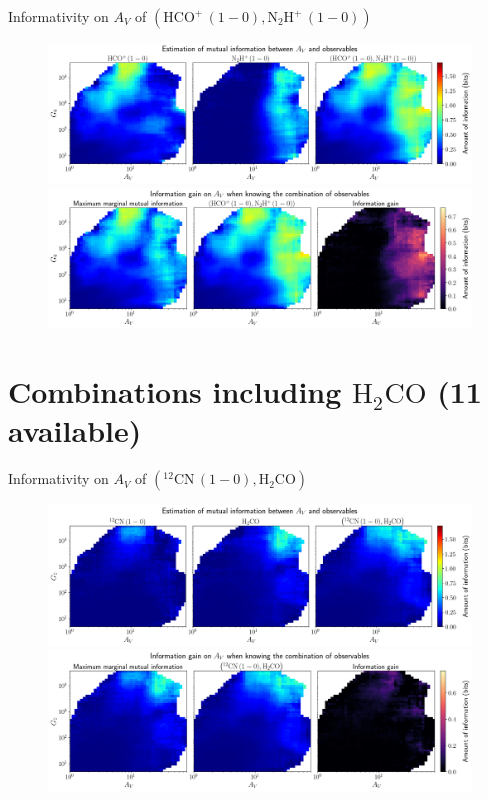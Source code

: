\documentclass{beamer}
\begin{document}
\begin{frame}{Informativity on $A_V$ of $\left(\mathrm{HCO^+\,(1-0)},\mathrm{N_2H^+\,(1-0)}\right)$}
    \begin{figure}
        \centering
        \includegraphics[width=0.95\linewidth]{../mi/av__hcop10_n2hp10_mi.png}
        \vfill
        \includegraphics[width=0.95\linewidth]{../mi/av__hcop10_n2hp10_mi_gain.png}
    \end{figure}
\end{frame}

\section{Combinations including $\mathrm{H_2CO}$ (11 available)}

\begin{frame}{Informativity on $A_V$ of $\left(\mathrm{^{12}CN\,(1-0)},\mathrm{H_2CO}\right)$}
    \begin{figure}
        \centering
        \includegraphics[width=0.95\linewidth]{../mi/av__12cn10_h2co_mi.png}
        \vfill
        \includegraphics[width=0.95\linewidth]{../mi/av__12cn10_h2co_mi_gain.png}
    \end{figure}
\end{frame}
\end{document}
